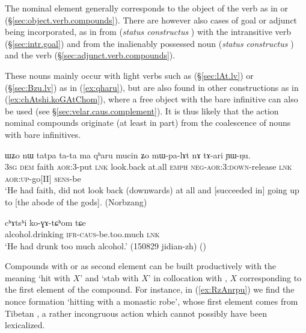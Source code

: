 The nominal element generally corresponds to the object of the verb as in  or  (§\ref{sec:object.verb.compounds}). There are however also cases of goal or adjunct being incorporated, as in  from  (\textit{status constructus} ) with the intransitive verb  (§\ref{sec:intr.goal}) and  from the inalienably possessed noun  (\textit{status constructus} ) and the verb  (§\ref{sec:adjunct.verb.compounds}).

These nouns mainly occur with light verbs such as  (§\ref{sec:lAt.lv}) or   (§\ref{sec:Bzu.lv})  as in  (\ref{ex:qharu}), but are also found in other constructions as in (\ref{ex:chAtshi.koGAtChom}), where a free object  with the bare infinitive  can also be used (see §\ref{sec:velar.caus.complement}). It is thus likely that the action nominal compounds originate (at least in part) from the coalescence of nouns with bare infinitives.

\begin{exe}
\ex \label{ex:qharu}
\gll ɯʑo nɯ  tatpa ta-ta ma qʰaru mucin ʑo mɯ-pa-lɤt nɤ tɤ-ari ɲɯ-ŋu. \\
\textsc{3sg} \textsc{dem} faith \textsc{aor}:3\flobv{}-put \textsc{lnk} look.back at.all \textsc{emph} \textsc{neg}-\textsc{aor}:3\flobv{}:\textsc{down}-release \textsc{lnk} \textsc{aor}:\textsc{up}-go[II] \textsc{sens}-be \\
\glt `He had faith, did not look back (downwards) at all and [succeeded in] going up to [the abode of the gods]. (Norbzang)
\end{exe}

\begin{exe}
\ex \label{ex:chAtshi.koGAtChom}
 \gll cʰɤtsʰi ko-ɣɤ-tɕʰom tɕe  \\
 alcohol.drinking \textsc{ifr}-\textsc{caus}-be.too.much \textsc{lnk} \\
\glt `He had drunk too much alcohol.' (150829 jidian-zh) ()
\end{exe}

Compounds with  or  as second element can be built productively with the meaning `hit with $X$' and `stab with $X$' in collocation with , $X$ corresponding to the first element of the compound. For instance, in (\ref{ex:RzAnrpu}) we find the nonce formation  `hitting with a monastic robe', whose first element  comes from Tibetan , a rather incongruous action which cannot possibly have been lexicalized.
 
